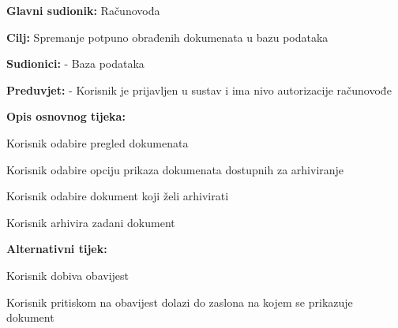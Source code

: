 					\noindent {}
						\begin{packed_item}
		
							\item \textbf{Glavni sudionik:} Računovođa
							\item  \textbf{Cilj:} Spremanje potpuno obrađenih dokumenata u bazu podataka
							\item  \textbf{Sudionici:} - Baza podataka
							\item  \textbf{Preduvjet:} - Korisnik je prijavljen u sustav i ima nivo autorizacije računovođe
							\item  \textbf{Opis osnovnog tijeka:}
							
							\item[] \begin{packed_enum}
								\item Korisnik odabire pregled dokumenata
								\item Korisnik odabire opciju prikaza dokumenata dostupnih za arhiviranje
								\item Korisnik odabire dokument koji želi arhivirati
								\item Korisnik arhivira zadani dokument
							\end{packed_enum}
							
							\item  \textbf{Alternativni tijek:}

							\item[] \begin{packed_item}
		
								\item[1-3.a]Korisnik dobiva obavijest
								\item[] \begin{packed_enum}
									\item Korisnik pritiskom na obavijest dolazi do zaslona na kojem se prikazuje dokument
								\end{packed_enum}
							\end{packed_item}
						\end{packed_item}

